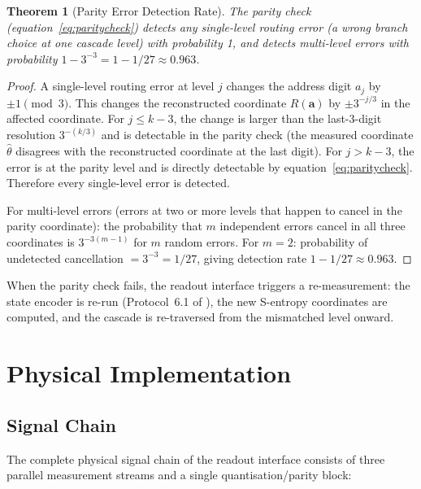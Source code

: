 \documentclass[11pt,twocolumn,a4paper]{article}
\newtheorem{theorem}{Theorem}[section]
\theoremstyle{definition}
\theoremstyle{remark}
\begin{document}
\begin{theorem}[Parity Error Detection Rate]
\label{thm:parity}
The parity check (equation~\eqref{eq:paritycheck}) detects any single-level
routing error (a wrong branch choice at one cascade level) with probability 1,
and detects multi-level errors with probability $1 - 3^{-3} = 1 - 1/27 \approx 0.963$.
\end{theorem}

\begin{proof}
A single-level routing error at level $j$ changes the address digit $a_j$ by
$\pm 1 \pmod 3$. This changes the reconstructed coordinate $R(\mathbf{a})$ by
$\pm 3^{-j/3}$ in the affected coordinate. For $j \leq k-3$, the change is larger
than the last-3-digit resolution $3^{-(k/3)}$ and is detectable in the
parity check (the measured coordinate $\hat{\theta}$ disagrees with the
reconstructed coordinate at the last digit). For $j > k-3$, the error is at
the parity level and is directly detectable by equation~\eqref{eq:paritycheck}.
Therefore every single-level error is detected.

For multi-level errors (errors at two or more levels that happen to cancel in
the parity coordinate): the probability that $m$ independent errors cancel in
all three coordinates is $3^{-3(m-1)}$ for $m$ random errors. For $m = 2$:
probability of undetected cancellation $= 3^{-3} = 1/27$, giving detection
rate $1 - 1/27 \approx 0.963$.
\end{proof}

When the parity check fails, the readout interface triggers a re-measurement:
the state encoder is re-run (Protocol~6.1 of \citep{companion2}), the new
S-entropy coordinates are computed, and the cascade is re-traversed from the
mismatched level onward.



\section{Physical Implementation}
\label{sec:implementation}

\subsection{Signal Chain}

The complete physical signal chain of the readout interface consists of
three parallel measurement streams and a single quantisation/parity block:
\end{document}
